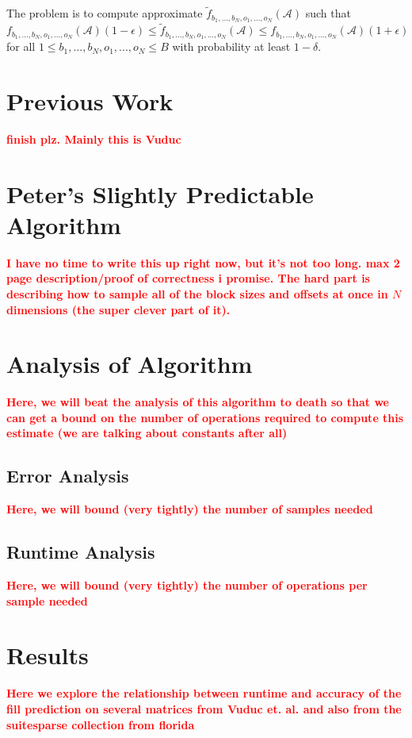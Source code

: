 \documentclass[12pt]{article}
\newcommand{\todo}[1] {\textbf{\textcolor{red}{#1}}}
\newcommand{\Ten}[1] {\mathbf{\mathcal{#1}}}
\begin{document}
    The problem is to compute approximate $\tilde{f}_{b_1, ..., b_N, o_1, ..., o_N}(\Ten{A})$ such that $f_{b_1, ..., b_N, o_1, ..., o_N}(\Ten{A})(1 - \epsilon) \leq \tilde{f}_{b_1, ..., b_N, o_1, ..., o_N}(\Ten{A}) \leq f_{b_1, ..., b_N, o_1, ..., o_N}(\Ten{A})(1 + \epsilon)$ for all $1 \leq b_1, ..., b_N, o_1, ..., o_N \leq B$ with probability at least $1 - \delta$.
  \section{Previous Work}
    \todo{finish plz. Mainly this is Vuduc}

  \section{Peter's Slightly Predictable Algorithm}

    \todo{I have no time to write this up right now, but it's not too long. max 2 page description/proof of correctness i promise. The hard part is describing how to sample all of the block sizes and offsets at once in $N$ dimensions (the super clever part of it).}

  \section{Analysis of Algorithm}
    \todo{Here, we will beat the analysis of this algorithm to death so that we can get a bound on the number of operations required to compute this estimate (we are talking about constants after all)}
    \subsection{Error Analysis}
      \todo{Here, we will bound (very tightly) the number of samples needed}
    \subsection{Runtime Analysis}
      \todo{Here, we will bound (very tightly) the number of operations per sample needed}

  \section{Results}
    \todo{Here we explore the relationship between runtime and accuracy of the fill prediction on several matrices from Vuduc et. al. and also from the suitesparse collection from florida}
\end{document}

